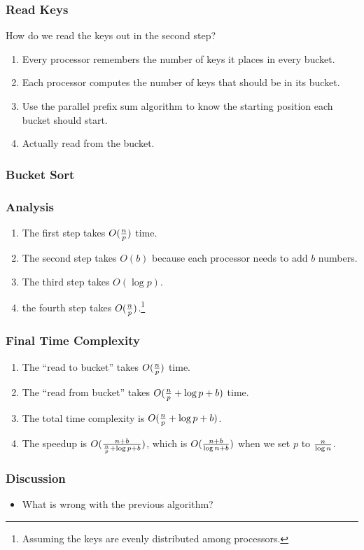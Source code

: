 \documentclass{beamer}
\begin{document}
\begin{CJK}{UTF8}{bsmi}
\begin{frame}
\frametitle{Read Keys}
How do we read the keys out in the second step?
\begin{enumerate}
\item Every processor remembers the number of keys it places in every
  bucket.
\item Each processor computes the number of keys that should be in its
  bucket.
\item Use the parallel prefix sum algorithm to know the starting
  position each bucket should start.
\item Actually read from the bucket.
\end{enumerate}
\end{frame}

\begin{frame}
\frametitle{Bucket Sort}
\centerline{}
\end{frame}

\begin{frame}
\frametitle{Analysis}
\begin{enumerate}
\item The first step takes $O({n \over p})$ time.
\item The second step takes $O(b)$ because each processor needs to add
  $b$ numbers.
\item The third step takes  $O(\log p)$.
\item the fourth step takes $O({n \over p})$.\footnote{Assuming the
  keys are evenly distributed among processors.}
\end{enumerate}
\end{frame}

\begin{frame}
\frametitle{Final Time Complexity}
\begin{enumerate}
\item The ``read to bucket'' takes $O({n \over p})$ time.
\item The ``read from bucket'' takes $O({n \over p} + \log p + b)$ time.
\item The total time complexity is $O({n \over p} + \log p + b)$.
\item The speedup is $O({{n + b} \over {{n \over p} + \log p + b}})$, which is $O({{n + b} \over {\log n + b}})$ when we set $p$ to $n \over {\log n}$.
\end{enumerate}
\end{frame}

\begin{frame}
\frametitle{Discussion}
\begin{itemize}
\item What is wrong with the previous algorithm?
\end{itemize}
\end{frame}


\end{CJK}
\end{document}
